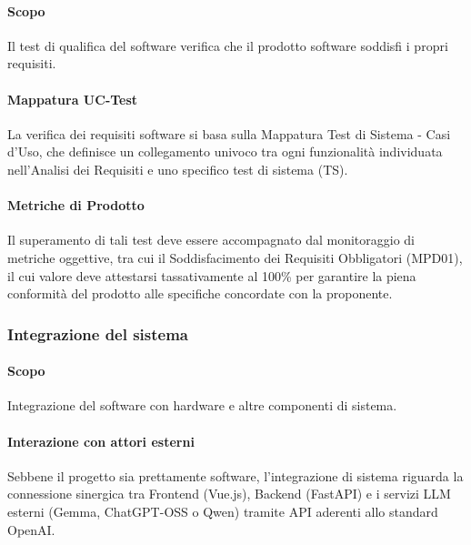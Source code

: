 \paragraph{Scopo}

Il test di qualifica del software verifica che il prodotto software soddisfi i propri requisiti.

\paragraph{Mappatura UC-Test}

La verifica dei requisiti software si basa sulla Mappatura Test di Sistema - Casi d’Uso, che definisce un collegamento univoco tra ogni funzionalità individuata nell'Analisi dei Requisiti e uno specifico test di sistema (TS). 

\paragraph{Metriche di Prodotto}

Il superamento di tali test deve essere accompagnato dal monitoraggio di metriche oggettive, tra cui il Soddisfacimento dei Requisiti Obbligatori (MPD01), il cui valore deve attestarsi tassativamente al 100\% per garantire la piena conformità del prodotto alle specifiche concordate con la proponente.


\subsubsection{Integrazione del sistema}

\paragraph{Scopo}

Integrazione del software con hardware e altre componenti di sistema. 

\paragraph{Interazione con attori esterni}

Sebbene il progetto sia prettamente software, l'integrazione di sistema riguarda la connessione sinergica tra Frontend (Vue.js), Backend (FastAPI) e i servizi LLM esterni (Gemma, ChatGPT-OSS o Qwen) tramite API aderenti allo standard OpenAI.

